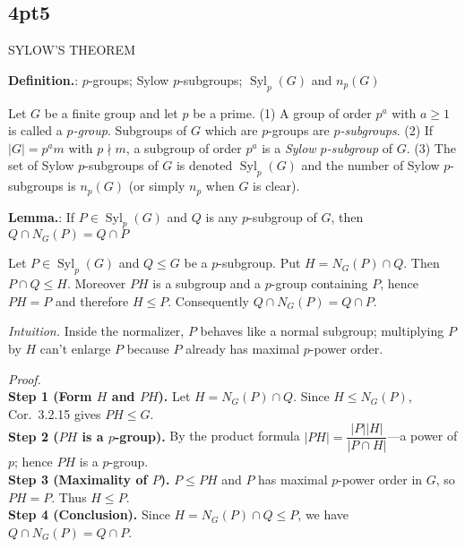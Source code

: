 \documentclass[12pt]{article}
\theoremstyle{definition}
\newcommand{\Syl}{\operatorname{Syl}}
\begin{document}
\newpage

\subsection*{4pt5}

\newpage

SYLOW'S THEOREM 

\newpage


\noindent\textbf{Definition.}: $p$-groups; Sylow $p$-subgroups; $\Syl_p(G)$ and $n_p(G)$

\newpage

Let $G$ be a finite group and let $p$ be a prime. (1) A group of order $p^a$ with $a\ge1$ is called a \emph{$p$-group}. Subgroups of $G$ which are $p$-groups are \emph{$p$-subgroups}. (2) If $|G|=p^a m$ with $p\nmid m$, a subgroup of order $p^a$ is a \emph{Sylow $p$-subgroup} of $G$. (3) The set of Sylow $p$-subgroups of $G$ is denoted $\Syl_p(G)$ and the number of Sylow $p$-subgroups is $n_p(G)$ (or simply $n_p$ when $G$ is clear).\\


\newpage


\noindent\textbf{Lemma.}: If $P\in \Syl_p(G)$ and $Q$ is any $p$-subgroup of $G$, then $Q\cap N_G(P)=Q\cap P$

\newpage

Let $P\in \Syl_p(G)$ and $Q\le G$ be a $p$-subgroup. Put $H=N_G(P)\cap Q$. Then $P\cap Q\le H$. Moreover $PH$ is a subgroup and a $p$-group containing $P$, hence $PH=P$ and therefore $H\le P$. Consequently $Q\cap N_G(P)=Q\cap P$.\\

\dotfill

\emph{Intuition.} Inside the normalizer, $P$ behaves like a normal subgroup; multiplying $P$ by $H$ can’t enlarge $P$ because $P$ already has maximal $p$-power order.

\dotfill

\emph{Proof.}\\
\textbf{Step 1 (Form $H$ and $PH$).} Let $H=N_G(P)\cap Q$. Since $H\le N_G(P)$, Cor.~3.2.15 gives $PH\le G$.\\
\textbf{Step 2 ($PH$ is a $p$-group).} By the product formula $|PH|=\dfrac{|P||H|}{|P\cap H|}$—a power of $p$; hence $PH$ is a $p$-group.\\
\textbf{Step 3 (Maximality of $P$).} $P\le PH$ and $P$ has maximal $p$-power order in $G$, so $PH=P$. Thus $H\le P$.\\
\textbf{Step 4 (Conclusion).} Since $H=N_G(P)\cap Q\le P$, we have $Q\cap N_G(P)=Q\cap P$.\\
\end{document}
